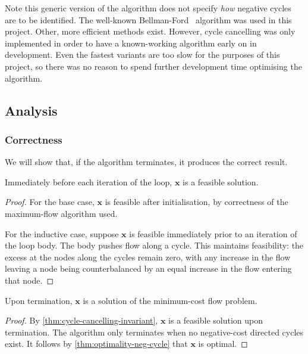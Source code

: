 Note this generic version of the algorithm does not specify \emph{how} negative cycles are to be identified. The well-known Bellman-Ford~\cite[p.~651]{CLRS:2009} algorithm was used in this project. Other, more efficient methods exist. However, cycle cancelling was only implemented in order to have a known-working algorithm early on in development. Even the fastest variants are too slow for the purposes of this project, so there was no reason to spend further development time optimising the algorithm.

\subsection{Analysis}

\subsubsection{Correctness}

We will show that, if the algorithm terminates, it produces the correct result. \\

\begin{thm} \label{thm:cycle-cancelling-invariant}
Immediately before each iteration of the loop, $\mathbf{x}$ is a feasible solution.
\end{thm} 
\begin{proof}
For the base case, $\mathbf{x}$ is feasible after initialisation, by correctness of the maximum-flow algorithm used.

For the inductive case, suppose $\mathbf{x}$ is feasible immediately prior to an iteration of the loop body. The body pushes flow along a cycle. This maintains feasibility: the excess at the nodes along the cycles remain zero, with any increase in the flow leaving a node being counterbalanced by an equal increase in the flow entering that node.
\end{proof}

\begin{cor}
Upon termination, $\mathbf{x}$ is a solution of the minimum-cost flow problem.
\end{cor}
\begin{proof}
By \cref{thm:cycle-cancelling-invariant}, $\mathbf{x}$ is a feasible solution upon termination. The algorithm only terminates when no negative-cost directed cycles exist. It follows by \cref{thm:optimality-neg-cycle} that $\mathbf{x}$ is optimal.
\end{proof}

